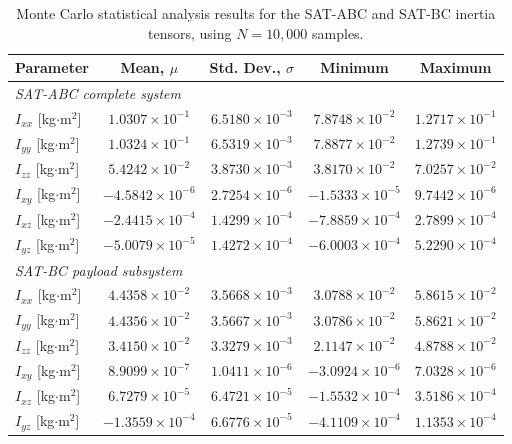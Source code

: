\begin{table}[htbp]
\centering
\caption{Monte Carlo statistical analysis results for the SAT-ABC and SAT-BC inertia tensors, using \(N=10{,}000\) samples.}
\label{tab:app_adcs_monte_carlo_inertia_statistics}
\small
\begin{tabular}{lcccc}
\hline
\textbf{Parameter} & \textbf{Mean, \(\mu\)} & \textbf{Std. Dev., \(\sigma\)} & \textbf{Minimum} & \textbf{Maximum} \\ \hline
\multicolumn{5}{l}{\textit{SAT-ABC complete system}} \\ \hline
\(I_{xx}\) [kg\(\cdot\)m\(^2\)] & \(1.0307 \times 10^{-1}\) & \(6.5180 \times 10^{-3}\) & \(7.8748 \times 10^{-2}\) & \(1.2717 \times 10^{-1}\) \\
\(I_{yy}\) [kg\(\cdot\)m\(^2\)] & \(1.0324 \times 10^{-1}\) & \(6.5319 \times 10^{-3}\) & \(7.8877 \times 10^{-2}\) & \(1.2739 \times 10^{-1}\) \\
\(I_{zz}\) [kg\(\cdot\)m\(^2\)] & \(5.4242 \times 10^{-2}\) & \(3.8730 \times 10^{-3}\) & \(3.8170 \times 10^{-2}\) & \(7.0257 \times 10^{-2}\) \\
\(I_{xy}\) [kg\(\cdot\)m\(^2\)] & \(-4.5842 \times 10^{-6}\) & \(2.7254 \times 10^{-6}\) & \(-1.5333 \times 10^{-5}\) & \(9.7442 \times 10^{-6}\) \\
\(I_{xz}\) [kg\(\cdot\)m\(^2\)] & \(-2.4415 \times 10^{-4}\) & \(1.4299 \times 10^{-4}\) & \(-7.8859 \times 10^{-4}\) & \(2.7899 \times 10^{-4}\) \\
\(I_{yz}\) [kg\(\cdot\)m\(^2\)] & \(-5.0079 \times 10^{-5}\) & \(1.4272 \times 10^{-4}\) & \(-6.0003 \times 10^{-4}\) & \(5.2290 \times 10^{-4}\) \\ \hline
\multicolumn{5}{l}{\textit{SAT-BC payload subsystem}} \\ \hline
\(I_{xx}\) [kg\(\cdot\)m\(^2\)] & \(4.4358 \times 10^{-2}\) & \(3.5668 \times 10^{-3}\) & \(3.0788 \times 10^{-2}\) & \(5.8615 \times 10^{-2}\) \\
\(I_{yy}\) [kg\(\cdot\)m\(^2\)] & \(4.4356 \times 10^{-2}\) & \(3.5667 \times 10^{-3}\) & \(3.0786 \times 10^{-2}\) & \(5.8621 \times 10^{-2}\) \\
\(I_{zz}\) [kg\(\cdot\)m\(^2\)] & \(3.4150 \times 10^{-2}\) & \(3.3279 \times 10^{-3}\) & \(2.1147 \times 10^{-2}\) & \(4.8788 \times 10^{-2}\) \\
\(I_{xy}\) [kg\(\cdot\)m\(^2\)] & \(8.9099 \times 10^{-7}\) & \(1.0411 \times 10^{-6}\) & \(-3.0924 \times 10^{-6}\) & \(7.0328 \times 10^{-6}\) \\
\(I_{xz}\) [kg\(\cdot\)m\(^2\)] & \(6.7279 \times 10^{-5}\) & \(6.4721 \times 10^{-5}\) & \(-1.5532 \times 10^{-4}\) & \(3.5186 \times 10^{-4}\) \\
\(I_{yz}\) [kg\(\cdot\)m\(^2\)] & \(-1.3559 \times 10^{-4}\) & \(6.6776 \times 10^{-5}\) & \(-4.1109 \times 10^{-4}\) & \(1.1353 \times 10^{-4}\) \\ \hline
\end{tabular}
\end{table}

